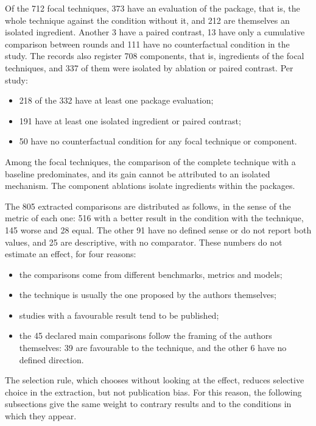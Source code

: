 Of the 712 focal techniques, 373 have an evaluation of the package, that is, the whole technique against the condition without it, and 212
are themselves an isolated ingredient. Another 3 have a paired contrast, 13 have only a cumulative comparison between
rounds and 111 have no counterfactual condition in the study. The records also register 708 components, that is,
ingredients of the focal techniques, and 337 of them were isolated by ablation or paired contrast. Per study:
\begin{itemize}
  \item 218 of the 332 have at least one package evaluation;
  \item 191 have at least one isolated ingredient or paired contrast;
  \item 50 have no counterfactual condition for any focal technique or component.
\end{itemize}
Among the focal techniques, the comparison of the complete technique with a baseline predominates, and its gain cannot be
attributed to an isolated mechanism. The component ablations isolate ingredients within the packages.

The 805 extracted comparisons are distributed as follows, in the sense of the metric of each one: 516 with a better result in the
condition with the technique, 145 worse and 28 equal. The other 91 have no defined sense or do not report both values, and
25 are descriptive, with no comparator. These numbers do not estimate an effect, for four reasons:
\begin{itemize}
  \item the comparisons come from different benchmarks, metrics and models;
  \item the technique is usually the one proposed by the authors themselves;
  \item studies with a favourable result tend to be published;
  \item the 45 declared main comparisons follow the framing of the authors themselves: 39 are favourable to the technique,
  and the other 6 have no defined direction.
\end{itemize}
The selection rule, which chooses without looking at the effect, reduces selective choice in the extraction, but not publication
bias. For this reason, the following subsections give the same weight to contrary results and to the conditions in which they
appear.




